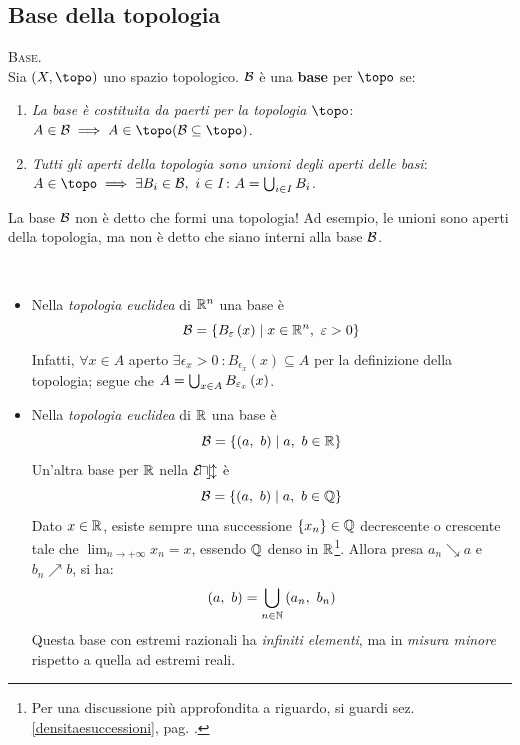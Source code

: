 \subsection{Base della topologia}
\begin{define}\textsc{Base.}\\
Sia $\left(X, \topo\right)$ uno spazio topologico. $\mathcal{B}$ è una \textbf{base} per $\topo$ se:
\begin{enumerate}
\item \textit{La base è costituita da paerti per la topologia $\topo$}: $A\in\basis\implies A\in\topo (\basis\subseteq\topo)$.
\item \textit{Tutti gli aperti della topologia sono unioni degli aperti delle basi}:
$A\in\topo\implies\exists B_i\in\basis,\ i\in I\colon A=\union_{i\in I}B_i$.
\end{enumerate}
\vspace{-3mm}
\end{define}
\begin{attention}
La base $\mathcal{B}$ non è detto che formi una topologia! Ad esempio, le unioni sono aperti della topologia, ma non è detto che siano interni alla base $\mathcal{B}$.
\end{attention}
\begin{examples}~{}
\begin{itemize}
\item Nella \textit{topologia euclidea} di $\mathbb{R}^n$ una base è
\begin{equation}
\mathcal{B}=\left\{B_{\varepsilon}\left(x\right)\mid x\in\mathbb{R}^n,\ \varepsilon>0\right\}
\end{equation}
Infatti, $\forall x\in A$ aperto $\exists\epsilon_x>0\ \colon B_{\epsilon_x}\left(x\right)\subseteq A$ per la definizione della topologia; segue che $A=\mathop{{\bigcup}}\displaylimits_{x\in A}B_{\varepsilon_x}\left(x\right)$.
\item Nella \textit{topologia euclidea} di $\mathbb{R}$ una base è
\begin{equation}
	\mathcal{B}=\left\{\left(a,\ b\right)\mid a,\ b\in \mathbb{R}\right\}
\end{equation}
Un'altra base per $\mathbb{R}$ nella $\mathcal{E\! u\! c\! l}$ è 
\begin{equation*}
	\mathcal{B}=\left\{\left(a,\ b\right)\mid a,\ b\in \mathbb{Q}\right\}
\end{equation*}
Dato $x\in\mathbb{R}$, esiste sempre una successione $\left\{x_n\right\}\in\mathbb{Q}$ decrescente o crescente tale che $\displaystyle\lim_{n \to +\infty}x_n=x$, essendo $\mathbb{Q}$ denso in $\mathbb{R}$\footnote{Per una discussione più approfondita a riguardo, si guardi sez. \ref{densitaesuccessioni}, pag. \pageref{densitaesuccessioni}.}. Allora presa $a_n\searrow a$ e $b_n\nearrow b$, si ha:
\begin{equation*}
\left(a,\ b\right)=\mathop{{\bigcup}}\displaylimits_{n\in \mathbb{N}}\left(a_n,\ b_n\right)
\end{equation*}
Questa base con estremi razionali ha \textit{infiniti elementi}, ma in \textit{misura minore} rispetto a quella ad estremi reali.
\end{itemize}
\end{examples}
